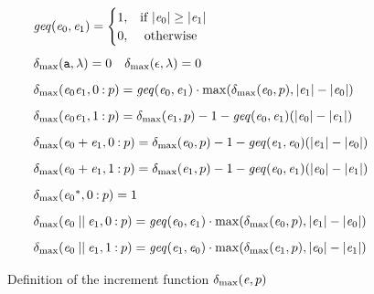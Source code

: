 \begin{figure}
 $$
  \begin{array}{l}
   \geqFun{\re_0}{\re_1}=
   \begin{cases}
    1, & \text{if } \theight{\re_0} \geq \theight{\re_1} \\
    0, & \text{ otherwise}
   \end{cases}                                                                                   \\[4ex]
   \incFun{\sym}{\emptyPath}=0\quad \incFun{\eps}{\emptyPath}=0                                                                           \\[2ex]
   \incFun{\re_0\catop\re_1}{0\pathCons\tpath}=\geqFun{\re_0}{\re_1}\cdot\max(\incFun{\re_0}{\tpath},\theight{\re_1}-\theight{\re_0})     \\[2ex]
   \incFun{\re_0\catop\re_1}{1\pathCons\tpath}=\incFun{\re_1}{\tpath}-1-\geqFun{\re_0}{\re_1}(\theight{\re_0}-\theight{\re_1})            \\[2ex]
   \incFun{\re_0\orop\re_1}{0\pathCons\tpath}=\incFun{\re_0}{\tpath}-1-\geqFun{\re_1}{\re_0}(\theight{\re_1}-\theight{\re_0})             \\[2ex]
   \incFun{\re_0\orop\re_1}{1\pathCons\tpath}=\incFun{\re_1}{\tpath}-1-\geqFun{\re_0}{\re_1}(\theight{\re_0}-\theight{\re_1})             \\[2ex]
   \incFun{\starop{\re_0}}{0\pathCons\tpath}=1 %
   \\[2ex]
   \incFun{\re_0\shuffleop\re_1}{0\pathCons\tpath}=\geqFun{\re_0}{\re_1}\cdot\max(\incFun{\re_0}{\tpath},\theight{\re_1}-\theight{\re_0}) \\[2ex]
   \incFun{\re_0\shuffleop\re_1}{1\pathCons\tpath}=\geqFun{\re_1}{\re_0}\cdot\max(\incFun{\re_1}{\tpath},\theight{\re_0}-\theight{\re_1})
  \end{array}
 $$
 \caption{Definition of the increment function ${\delta_{\max}}({\mathit {e}},{p})$}
 \label{fig:inc-pred}
\end{figure}


